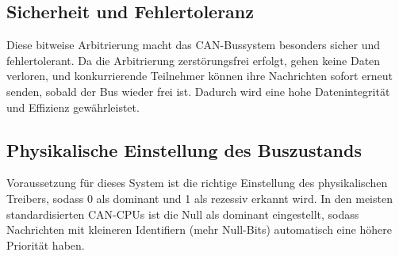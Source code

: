 \subsection{Sicherheit und Fehlertoleranz}
Diese bitweise Arbitrierung macht das CAN-Bussystem besonders sicher und fehlertolerant. 
Da die Arbitrierung zerstörungsfrei erfolgt, gehen keine Daten verloren, 
und konkurrierende Teilnehmer können ihre Nachrichten sofort erneut senden, 
sobald der Bus wieder frei ist. Dadurch wird eine hohe Datenintegrität und Effizienz gewährleistet.

\subsection{Physikalische Einstellung des Buszustands}
Voraussetzung für dieses System ist die richtige Einstellung des physikalischen Treibers, 
sodass 0 als dominant und 1 als rezessiv erkannt wird. 
In den meisten standardisierten CAN-CPUs ist die Null als dominant eingestellt, 
sodass Nachrichten mit kleineren Identifiern (mehr Null-Bits) automatisch eine höhere 
Priorität haben.
